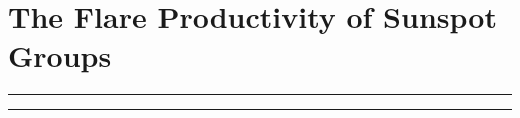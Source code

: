 
\chapter{The Flare Productivity of Sunspot Groups} %
\label{chapter:results_activity}


\graphicspath{{X/figures/EPS/}{5/figures/}}

\glsresetall

\hrule height 1mm
\vspace{0.5mm}
\hrule height 0.4mm 
\noindent 
